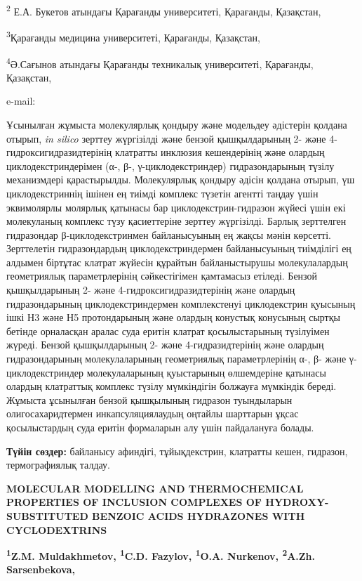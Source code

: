 \textsuperscript{2} Е.А. Букетов атындағы Қарағанды университеті,
Қарағанды, Қазақстан,

\textsuperscript{3}Қарағанды медицина университеті, Қарағанды,
Қазақстан,

\textsuperscript{4}Ә.Сағынов атындағы Қарағанды техникалық университеті,
Қарағанды, Қазақстан,

e-mail: \href{mailto:iosu8990@mail.ru}{}

Ұсынылған жұмыста молекулярлық қондыру және модельдеу әдістерін қолдана
отырып, \emph{in silico} зерттеу жүргізілді және бензой қышқылдарының 2-
және 4-гидроксигидразидтерінің клатратты инклюзия кешендерінің және
олардың циклодекстриндерімен (α-, β-, γ-циклодекстриндер)
гидразондарының түзілу механизмдері қарастырылды. Молекулярлық қондыру
әдісін қолдана отырып, үш циклодекстриннің ішінен ең тиімді комплекс
түзетін агентті таңдау үшін эквимолярлы молярлық қатынасы бар
циклодекстрин-гидразон жүйесі үшін екі молекуланың комплекс түзу
қасиеттеріне зерттеу жүргізілді. Барлық зерттелген гидразондар
β-циклодекстринмен байланысуының ең жақсы мәнін көрсетті. Зерттелетін
гидразондардың циклодекстриндермен байланысуының тиімділігі ең алдымен
біртұтас клатрат жүйесін құрайтын байланыстырушы молекулалардың
геометриялық параметрлерінің сәйкестігімен қамтамасыз етіледі. Бензой
қышқылдарының 2- және 4-гидроксигидразидтерінің және олардың
гидразондарының циклодекстриндермен комплекстенуі циклодекстрин қуысының
ішкі Н3 және Н5 протондарының және олардың конустық конусының сыртқы
бетінде орналасқан аралас суда еритін клатрат қосылыстарының түзілуімен
жүреді. Бензой қышқылдарының 2- және 4-гидразидтерінің және олардың
гидразондарының молекулаларының геометриялық параметрлерінің α-, β- және
γ-циклодекстриндер молекулаларының қуыстарының өлшемдеріне қатынасы
олардың клатраттық комплекс түзілу мүмкіндігін болжауға мүмкіндік
береді. Жұмыста ұсынылған бензой қышқылының гидразон туындыларын
олигосахаридтермен инкапсуляциялаудың оңтайлы шарттарын ұқсас
қосылыстардың суда еритін формаларын алу үшін пайдалануға болады.

{\bfseries Түйін сөздер:} байланысу афиндігі, тұйықдекстрин, клатратты
кешен, гидразон, термографиялық талдау.

{\bfseries MOLECULAR MODELLING AND THERMOCHEMICAL PROPERTIES OF INCLUSION
COMPLEXES OF HYDROXY-SUBSTITUTED BENZOIC ACIDS HYDRAZONES WITH
CYCLODEXTRINS}

{\bfseries \textsuperscript{1}Z.M. Muldakhmetov, \textsuperscript{1}C.D.
Fazylov\textsuperscript{\envelope }, \textsuperscript{1}O.A. Nurkenov,
\textsuperscript{2}A.Zh. Sarsenbekova,}

